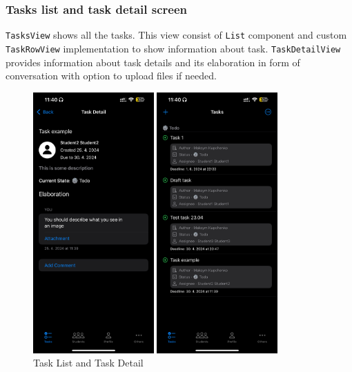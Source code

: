 \documentclass[
  biblatex = false,
  language=english,
  figures=false,
  sourcecodes,
  glossaries,
  index
]{kidiplom}
\begin{document}
\subsubsection{Tasks list and task detail screen}
\texttt{TasksView} shows all the tasks. This view consist of \texttt{List} component and custom \texttt{TaskRowView} implementation to show information about task.
\texttt{TaskDetailView} provides information about task details and its elaboration in form of conversation with option to upload files if needed.

\begin{figure}[ht]
\centering
\begin{minipage}[b]{0.4\textwidth}
	\includegraphics[height=10cm]{image8}
\end{minipage}
\begin{minipage}[b]{0.4\textwidth}
	\includegraphics[height=10cm]{image9}
\end{minipage}
\caption{Task List and Task Detail}
\label{fig:image8-9}
\end{figure}
\end{document}
